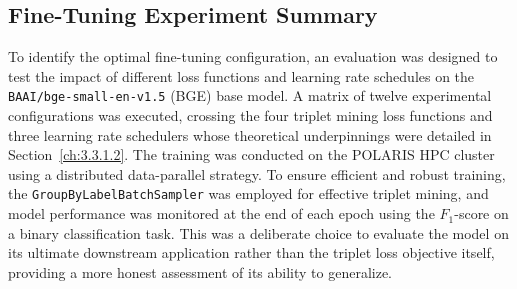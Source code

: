 \subsection{Fine-Tuning Experiment Summary}\label{ch:4.4.1}
To identify the optimal fine-tuning configuration, an evaluation was designed to test the impact of different loss functions and learning rate schedules on the \verb|BAAI/bge-small-en-v1.5| (BGE) base model. A matrix of twelve experimental configurations was executed, crossing the four triplet mining loss functions and three learning rate schedulers whose theoretical underpinnings were detailed in Section~\ref{ch:3.3.1.2}. The training was conducted on the POLARIS HPC cluster using a distributed data-parallel strategy. To ensure efficient and robust training, the \verb|GroupByLabelBatchSampler| was employed for effective triplet mining, and model performance was monitored at the end of each epoch using the \(F_1\)-score on a binary classification task. This was a deliberate choice to evaluate the model on its ultimate downstream application rather than the triplet loss objective itself, providing a more honest assessment of its ability to generalize.{\setlength{\emergencystretch}{5em}\par}

